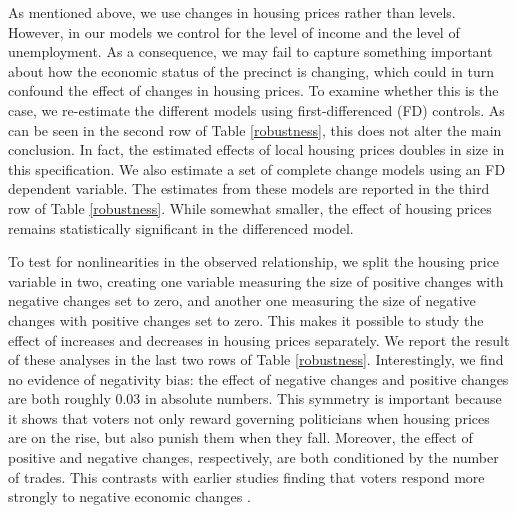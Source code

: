 \documentclass[12pt,a4paper]{article}
\begin{document}
	As mentioned above, we use changes in housing prices rather than levels. However, in our models we control for the level of income and the level of unemployment. As a consequence, we may fail to capture something important about how the economic status of the precinct is changing, which could in turn confound the effect of changes in housing prices. To examine whether this is the case, we re-estimate the different models using first-differenced (FD) controls. As can be seen in the second row of Table \ref{robustness}, this does not alter the main conclusion. In fact, the estimated effects of local housing prices doubles in size in this specification. We also estimate a set of complete change models using an FD dependent variable. The estimates from these models are reported in the third row of Table \ref{robustness}. While somewhat smaller, the effect of housing prices remains statistically significant in the differenced model.
	
	To test for nonlinearities in the observed relationship, we split the housing price variable in two, creating one variable measuring the size of positive changes with negative changes set to zero, and another one measuring the size of negative changes with positive changes set to zero. This makes it possible to study the effect of increases and decreases in housing prices separately. We report the result of these analyses in the last two rows of Table \ref{robustness}. Interestingly, we find no evidence of negativity bias: the effect of negative changes and positive changes are both roughly 0.03 in absolute numbers. This symmetry is important because it shows that voters not only reward governing politicians when housing prices are on the rise, but also punish them when they fall. Moreover, the effect of positive and negative changes, respectively, are both conditioned by the number of trades.  This contrasts with earlier studies finding that voters respond more strongly to negative economic changes \citep[e.g.][]{bloom1975voter,headrick1991attention,soroka2014negativity}. 
	
\end{document}
